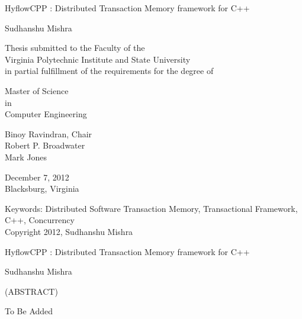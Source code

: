 \documentclass[12pt,english]{report}
\begin{document}
\thispagestyle{empty}
\begin{center}

{\Large 
HyflowCPP : Distributed Transaction Memory framework for C++
}

\vfill

Sudhanshu Mishra

\vfill

Thesis submitted to the Faculty of the \\
Virginia Polytechnic Institute and State University \\
in partial fulfillment of the requirements for the degree of

\vfill

Master of Science \\
in \\
Computer Engineering


\vfill

Binoy Ravindran, Chair \\
Robert P. Broadwater \\
Mark Jones


\vfill

December 7, 2012 \\
Blacksburg, Virginia

\vfill

Keywords: Distributed Software Transaction Memory, Transactional Framework, C++, Concurrency
\\
Copyright 2012, Sudhanshu Mishra

\end{center}

\pagebreak

\thispagestyle{empty}
\begin{center}

{\large
HyflowCPP : Distributed Transaction Memory framework for C++
}

\vfill

Sudhanshu Mishra

\vfill

(ABSTRACT)

\vfill

\end{center}

To Be Added




\vfill


\end{document}
